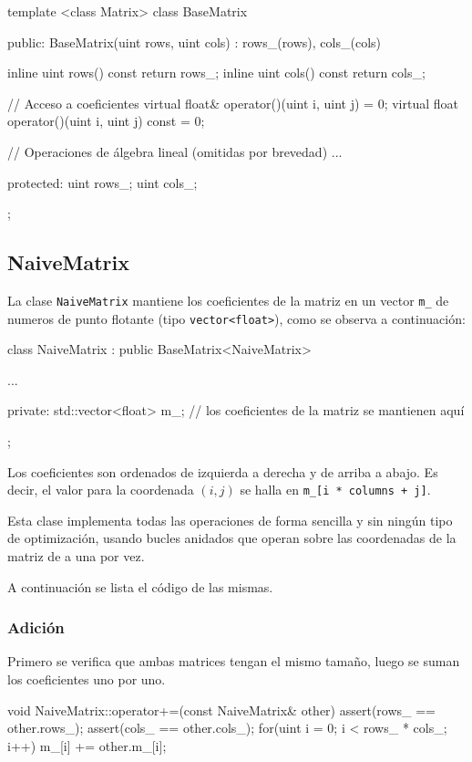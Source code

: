 \documentclass[a4paper, 10pt, twoside]{article}
\newcommand{\cc}[1]{\texttt{#1}}
\begin{document}
\begin{code}
  template <class Matrix>
  class BaseMatrix {
   public:
    BaseMatrix(uint rows, uint cols) : rows_(rows), cols_(cols) {}

    inline uint rows() const { return rows_; }
    inline uint cols() const { return cols_; }

    // Acceso a coeficientes
    virtual float& operator()(uint i, uint j) = 0;
    virtual float operator()(uint i, uint j) const = 0;

    // Operaciones de álgebra lineal (omitidas por brevedad)
    ...

   protected:
    uint rows_;
    uint cols_;
  };
\end{code}


\subsection{NaiveMatrix}

La clase \cc{NaiveMatrix} mantiene los coeficientes de la matriz en un vector
\cc{m\_} de numeros de punto flotante (tipo \cc{vector<float>}), como se observa
a continuación:

\begin{code}
  class NaiveMatrix : public BaseMatrix<NaiveMatrix> {
    ...

   private:
    std::vector<float> m_;  // los coeficientes de la matriz se mantienen aquí
  };
\end{code}

Los coeficientes son ordenados de izquierda a derecha y de arriba a abajo. Es
decir, el valor para la coordenada $(i, j)$ se halla en \cc{m\_[i * columns +
j]}.

Esta clase implementa todas las operaciones de forma sencilla y sin ningún tipo
de optimización, usando bucles anidados que operan sobre las coordenadas de la
matriz de a una por vez.

A continuación se lista el código de las mismas.


\subsubsection{Adición}

Primero se verifica que ambas matrices tengan el mismo tamaño, luego se suman
los coeficientes uno por uno.

\begin{code}
  void NaiveMatrix::operator+=(const NaiveMatrix& other) {
    assert(rows_ == other.rows_);
    assert(cols_ == other.cols_);
    for(uint i = 0; i < rows_ * cols_; i++) {
      m_[i] += other.m_[i];
    }
  }
\end{code}
\end{document}
